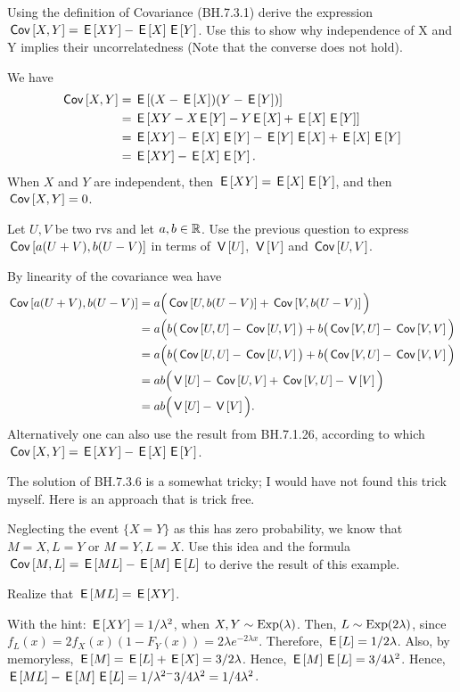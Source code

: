 \begin{exercise}
Using the definition of Covariance (BH.7.3.1) derive the expression $\cov{X,Y}=\E{XY}-\E{X}\E{Y}$. Use this to show why independence of X and Y implies their uncorrelatedness (Note that the converse does not hold).
\begin{solution}
We have
\begin{align}
    \cov{X,Y} &= \E{(X - \E{X})(Y - \E{Y})} \\
    &= \E{XY - X\E{Y} - Y\E{X} + \E{X}\E{Y}} \\
    &= \E{XY} - \E{X}\E{Y} - \E{Y} \E{X} + \E{X}\E{Y}\\
    &= \E{XY}-\E{X}\E{Y}.
\end{align}
When $X$ and $Y$ are independent, then $\E{XY} = \E X \E Y$, and then $\cov{X,Y}=0$.
\end{solution}
\end{exercise}

\begin{exercise}
Let $U, V$ be two rvs and let $a,b\in \R$.
Use the previous question to express $\cov{a(U+V), b(U-V)}$ in terms of $\V{U}$, $\V{V}$ and $\cov{U,V}$.
\begin{solution}
By linearity of the covariance wea have
\begin{align}
    \cov{a(U+V), b(U-V)} &= a \Big( \cov{U, b(U-V)} + \cov{V, b(U-V)} \Big) \\
    &= a \Big( b\big( \cov{U, U} - \cov{U, V} \big)  + b\big( \cov{V, U} - \cov{V,V} \Big) \\
    &= a \Big( b\big( \cov{U, U} - \cov{U, V} \big)  + b\big( \cov{V, U} - \cov{V,V} \Big) \\
    &= a b \Big( \V{U} - \cov{U, V} + \cov{V, U} - \V{V} \Big) \\
    &= a b \Big( \V{U} - \V{V} \Big).
\end{align}
Alternatively one can also use the result from BH.7.1.26, according to which $\cov{X,Y} = \E{XY}-\E{X}\E{Y}$.
\end{solution}
\end{exercise}


\begin{exercise}\label{ex:3a}
The solution of BH.7.3.6 is a somewhat tricky; I would have not  found this trick myself. Here is an approach that is trick free.

Neglecting the event $\{X=Y\}$ as this has zero probability, we know that $M=X, L=Y$ or $M=Y, L=X$. Use this idea and the formula $\cov{M,L} = \E{ML} - \E M \E L$ to derive the result of this example.
\begin{hint}
Realize that $\E{ML} = \E{XY}$.
\end{hint}
\begin{solution}
With the hint: $\E{XY}=1/\lambda^{2}$, when $X, Y \sim\Exp{\lambda}$. Then, $L\sim \Exp{2\lambda}$, since $f_{L}(x) = 2 f_X(x) (1-F_Y(x)) = 2 \lambda e^{-2\lambda x}$. Therefore, $\E L = 1/2\lambda$. Also, by memoryless, $\E{M} = \E L + \E X = 3/2\lambda$. Hence, $\E{M}\E L = 3/4\lambda^{2}$. Hence, $\E{ML}- \E M \E L = 1/\lambda^{2-} 3/4\lambda^2 = 1/4\lambda^{2}$.
\end{solution}
\end{exercise}


